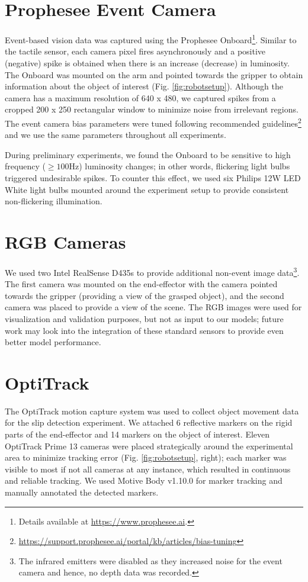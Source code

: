 \documentclass[fyp]{socreport}
\begin{document}
\section{Prophesee Event Camera}
Event-based vision data was captured using the Prophesee
Onboard\footnote{Details available at \url{https://www.prophesee.ai}.}. Similar
to the tactile sensor, each camera pixel fires asynchronously and a positive
(negative) spike is obtained when there is an increase (decrease) in luminosity.
The Onboard was mounted on the arm and pointed towards the gripper to obtain
information about the object of interest (Fig. \ref{fig:robotsetup}). Although
the camera has a maximum resolution of 640 x 480, we captured spikes from a
cropped 200 x 250 rectangular window to minimize noise from irrelevant regions.
The event camera bias parameters were tuned following recommended
guidelines\footnote{\url{https://support.prophesee.ai/portal/kb/articles/bias-tuning}}
and we use the same parameters throughout all experiments.

During preliminary experiments, we found the Onboard to be sensitive to high
frequency ($\geq 100$Hz) luminosity changes; in other words, flickering light
bulbs triggered undesirable spikes. To counter this effect, we used six Philips
12W LED White light bulbs mounted around the experiment setup to provide
consistent non-flickering illumination.

\section{RGB Cameras}
We used two Intel RealSense D435s to provide additional non-event image
data\footnote{The infrared emitters were disabled as they increased noise for
  the event camera and hence, no depth data was recorded.}. The first camera was
mounted on the end-effector with the camera pointed towards the gripper
(providing a view of the grasped object), and the second camera was placed to
provide a view of the scene. The RGB images were used for visualization and
validation purposes, but not as input to our models; future work may look into
the integration of these standard sensors to provide even better model
performance.

\section{OptiTrack}
The OptiTrack motion capture system was used to collect object movement data for
the slip detection experiment. We attached 6 reflective markers on the rigid
parts of the end-effector and 14 markers on the object of interest. Eleven
OptiTrack Prime 13 cameras were placed strategically around the experimental
area to minimize tracking error (Fig. \ref{fig:robotsetup}, right); each marker
was visible to most if not all cameras at any instance, which resulted in
continuous and reliable tracking. We used Motive Body v1.10.0 for marker
tracking and manually annotated the detected markers.
\end{document}
